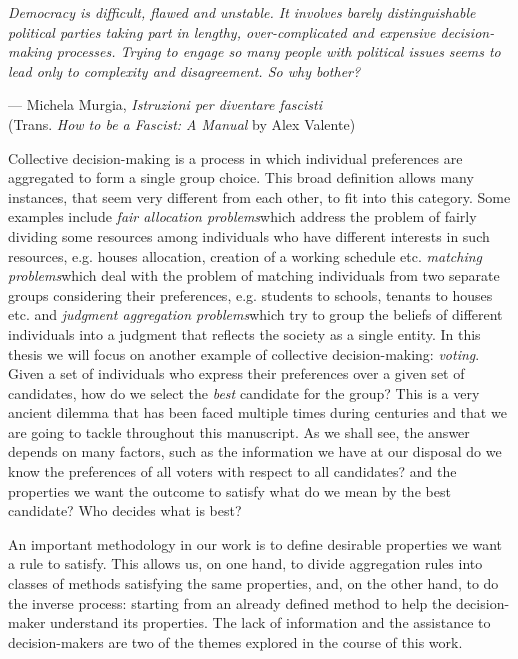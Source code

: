 \setlength{}
\setlength\epigraphrule{0pt}
\renewcommand{\textflush}{flushepinormal}
\epigraph{\itshape Democracy is difficult, flawed and unstable. It involves barely distinguishable political parties taking part in lengthy, over-complicated and expensive decision-making processes. Trying to engage so many people with political issues seems to lead only to complexity and disagreement. So why bother?}{--- Michela Murgia, \textit{Istruzioni per diventare fascisti}\\ \scriptsize{(Trans. \textit{How to be a Fascist: A Manual} by Alex Valente)}}


Collective decision-making is a process in which individual preferences are aggregated to form a single group choice. This broad definition allows many instances, that seem very different from each other, to fit into this category.
Some examples include \textit{fair allocation problems}\textemdash which address the problem of fairly dividing some resources among individuals who have different interests in such resources, e.g. houses allocation, creation of a working schedule etc.\textemdash 
\textit{matching problems}\textemdash which deal with the problem of matching individuals from two separate groups considering their preferences, e.g. students to schools, tenants to houses etc.\textemdash 
and \textit{judgment aggregation problems}\textemdash which try to group the beliefs of different individuals into a judgment that reflects the society as a single entity.
In this thesis we will focus on another example of collective decision-making: \textit{voting}. Given a set of individuals who express their preferences over a given set of candidates, how do we select the \textit{best} candidate for the group? This is a very ancient dilemma that has been faced multiple times during centuries and that we are going to tackle throughout this manuscript.
As we shall see, the answer depends on many factors, such as the information we have at our disposal \textemdash do we know the preferences of all voters with respect to all candidates? \textemdash and the properties we want the outcome to satisfy \textemdash what do we mean by the best candidate? Who decides what is best?

An important methodology in our work is to define desirable properties we want a rule to satisfy. This allows us, on one hand, to divide aggregation rules into classes of methods satisfying the same properties, and, on the other hand, to do the inverse process: starting from an already defined method to help the decision-maker understand its properties.
The lack of information and the assistance to decision-makers are two of the themes explored in the course of this work.

